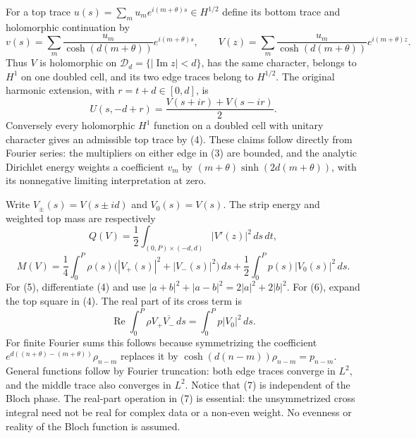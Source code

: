 \documentclass[11pt]{article}
\newcommand{\D}{\mathcal D}
\begin{document}
For a top trace
$u(s)=\sum_m u_m e^{i(m+\theta)s}\in H^{1/2}$ define its bottom trace
and holomorphic continuation by
\[
 v(s)=\sum_m\frac{u_m}{\cosh(d(m+\theta))}e^{i(m+\theta)s},
 \qquad
 V(z)=\sum_m\frac{u_m}{\cosh(d(m+\theta))}e^{i(m+\theta)z}.
 \tag{3}
\]
Thus $V$ is holomorphic on $\D_d=\{|\operatorname{Im}z|<d\}$, has
the same character, belongs to $H^1$ on one doubled cell, and its two
edge traces belong to $H^{1/2}$. The original harmonic extension, with
$r=t+d\in[0,d]$, is
\[
 U(s,-d+r)=\frac{V(s+ir)+V(s-ir)}2. \tag{4}
\]
Conversely every holomorphic $H^1$ function on a doubled cell with
unitary character gives an admissible top trace by (4). These claims
follow directly from Fourier series: the multipliers on either edge
in (3) are bounded, and the analytic Dirichlet energy weights a
coefficient $v_m$ by
$(m+\theta)\sinh(2d(m+\theta))$, with its nonnegative limiting
interpretation at zero.

Write $V_\pm(s)=V(s\pm id)$ and $V_0(s)=V(s)$. The strip energy and
weighted top mass are respectively
\[
 Q(V)=\frac12\int_{(0,P)\times(-d,d)}|V'(z)|^2\,ds\,dt, \tag{5}
\]
\[
 M(V)=\frac14\int_0^P\rho(s)
       \bigl(|V_+(s)|^2+|V_-(s)|^2\bigr)\,ds
       +\frac12\int_0^P p(s)|V_0(s)|^2\,ds. \tag{6}
\]
For (5), differentiate (4) and use
$|a+b|^2+|a-b|^2=2|a|^2+2|b|^2$.
For (6), expand the top square in (4). The real part of its cross
term is
\[
 \operatorname{Re}\int_0^P\rho V_+\overline{V_-}\,ds
 =\int_0^P p|V_0|^2\,ds. \tag{7}
\]
For finite Fourier sums this follows because symmetrizing the
coefficient $e^{d((n+\theta)-(m+\theta))}\rho_{n-m}$ replaces it by
$\cosh(d(n-m))\rho_{n-m}=p_{n-m}$. General functions follow by
Fourier truncation: both edge traces converge in $L^2$, and the middle
trace also converges in $L^2$. Notice that (7) is independent of the
Bloch phase.
The real-part operation in (7) is essential: the unsymmetrized
cross integral need not be real for complex data or a non-even
weight. No evenness or reality of the Bloch function is assumed.
\end{document}
